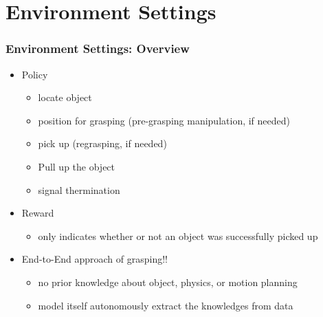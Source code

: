 \documentclass{beamer}
\newcommand{\fifthSec}{Environment Settings}
\begin{document}
  \section{\fifthSec}
    \begin{frame}
      \frametitle{\fifthSec : Overview}
      \begin{itemize}
        \item Policy
        \begin{itemize}
          \item locate object
          \item position for grasping (pre-grasping manipulation, if needed)
          \item pick up (regrasping, if needed)
          \item Pull up the object
          \item signal thermination
        \end{itemize}
        \pause
        \item Reward
        \begin{itemize}
          \item only indicates whether or not an object was successfully picked up
        \end{itemize}
        \pause
        \item End-to-End approach of grasping!!
        \begin{itemize}
          \item no prior knowledge about object, physics, or motion planning
          \item model itself autonomously extract the knowledges from data
        \end{itemize}
      \end{itemize}
    \end{frame}
\end{document}
